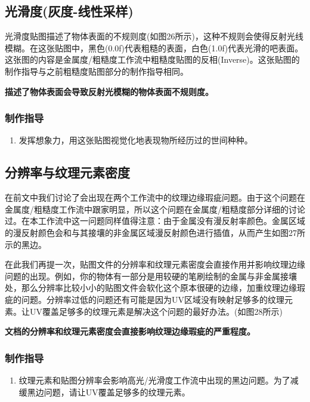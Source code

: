 \subsection{光滑度(灰度-线性采样)}

光滑度贴图描述了物体表面的不规则度(如图26所示)，这种不规则会使得反射光线模糊。在这张贴图中，黑色(0.0f)代表粗糙的表面，白色(1.0f)代表光滑的吧表面。这张图的内容是金属度/粗糙度工作流中粗糙度贴图的反相(Inverse)。这张贴图的制作指导与之前粗糙度贴图部分的制作指导相同。

\textbf{描述了物体表面会导致反射光模糊的物体表面不规则度。}

\subsubsection{制作指导}

\begin{enumerate}
\item 发挥想象力，用这张贴图视觉化地表现物所经历过的世间种种。
\end{enumerate}

\subsection{分辨率与纹理元素密度}

在前文中我们讨论了会出现在两个工作流中的纹理边缘瑕疵问题。由于这个问题在金属度/粗糙度工作流中跟家明显，所以这个问题在金属度/粗糙度部分详细的讨论过。在本工作流中这一问题同样值得注意：由于金属没有漫反射率颜色。金属区域的漫反射颜色会和与其接壤的非金属区域漫反射颜色进行插值，从而产生如图27所示的黑边。

在此我们再提一次，贴图文件的分辨率和纹理元素密度会直接作用并影响纹理边缘问题的出现。例如，你的物体有一部分是用较硬的笔刷绘制的金属与非金属接壤处，那么分辨率比较小小的贴图文件会软化这个原本很硬的边缘，加重纹理边缘瑕疵的问题。分辨率过低的问题还有可能是因为UV区域没有映射足够多的纹理元素。让UV覆盖足够多的纹理元素是解决这个问题的最好办法。(如图28所示)

\textbf{文档的分辨率和纹理元素密度会直接影响纹理边缘瑕疵的严重程度。}

\subsubsection{制作指导}

\begin{enumerate}
\item 纹理元素和贴图分辨率会影响高光/光滑度工作流中出现的黑边问题。为了减缓黑边问题，请让UV覆盖足够多的纹理元素。
\end{enumerate}

